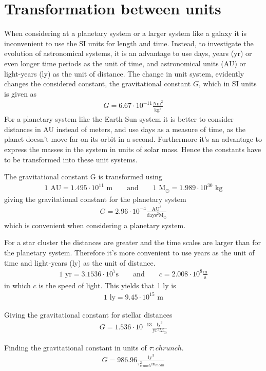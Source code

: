 \section{Transformation between units}
\label{sec:Conversion}
When considering at a planetary system or a larger system like a galaxy it is inconvenient to use the SI units for length and time.
Instead, to investigate the evolution of astronomical systems, it is an advantage to use days, years (yr) or even longer time periods as the unit of time, and astronomical units (AU) or light-years (ly) as the unit of distance.
The change in unit system, evidently changes the considered constant, the gravitational constant $G$, which in SI units is given as
\begin{align*}
	G = 6.67\cdot 10^{-11} \frac{\textrm{Nm}^2}{\textrm{kg}^2}
\end{align*}
For a planetary system like the Earth-Sun system it is better to consider distances in AU instead of meters, and use days as a measure of time, as the planet doesn't move far on its orbit in a second.
Furthermore it's an advantage to express the masses in the system in units of solar mass. 
Hence the constants have to be transformed into these unit systems. 

The gravitational constant G is transformed using
\begin{align*}
	1 \textrm{ AU} = 1.495\cdot10^{11} \textrm{ m}
	\qquad \text{and} \qquad
	1 \textrm{ M}_{\odot} = 1.989 \cdot 10^{30} \textrm{ kg}
\end{align*}
giving the gravitational constant for the planetary system
\begin{align*}
	G = 2.96\cdot 10^{-4} \frac{\textrm{AU}^3}{\textrm{days}^2 \textrm{M}_{\odot}}
\end{align*}
which is convenient when considering a planetary system.
 
For a star cluster the distances are greater and the time scales are larger than for the planetary system.
Therefore it's more convenient to use years as the unit of time and light-years (ly) as the unit of distance. 
\begin{align*}
	1 \textrm{ yr} = 3.1536\cdot10^7\textrm{s}
	\qquad \text{and} \qquad
	c = 2.008\cdot 10^8 \frac{\textrm{m}}{\textrm{s}}
\end{align*}
in which $c$ is the speed of light.
This yields that 1 ly is
\begin{align*}
	1 \textrm{ ly} = 9.45 \cdot 10^{15} \textrm{ m}
\end{align*}

Giving the gravitational constant for stellar distances 
\begin{align*}
	G = 1.536\cdot 10^{-13} \frac{\textrm{ly}^3}{\textrm{yr}^2 {\textrm{M}}_{\odot}}
\end{align*}



Finding the gravitational constant in units of $\tau:{chrunch}$. 
\begin{align*}
G = 986.96 \frac{\textrm{ly}^3}{\tau_{crunch}^2 \textrm{m}_{mean}}
\end{align*}

